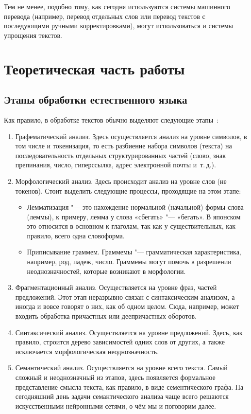 Тем не менее, подобно тому, как сегодня используются системы машинного перевода (например, перевод отдельных слов или перевод текстов с последующими ручными корректировками), могут использоваться и системы упрощения текстов.


\chapter{Теоретическая часть работы}


\section{Этапы обработки естественного языка}


Как правило, в обработке текстов обычно выделяют следующие этапы~\cite[с.~9]{Batruha}:
\begin{enumerate}[1.]%
  \item Графематический анализ.
    Здесь осуществляется анализ на уровне символов, в том числе и токенизация, то есть разбиение набора символов (текста) на последовательность отдельных структурированных частей (слово, знак препинания, число, гиперссылка, адрес электронной почты и~т.\,д.).
  \item Морфологический анализ.
    Здесь происходит анализ на уровне слов (не токенов).
    Стоит выделить следующие процессы, проходящие на этом этапе:
    \begin{itemize}%
      \item Лемматизация
        "--- это нахождение нормальной (начальной) формы слова (леммы), к примеру, лемма у слова «сбегать» "--- «бегать».
        В японском это относится в основном к глаголам, так как у существительных, как правило, всего одна словоформа. 
      \item Приписывание граммем.
        Граммемы "--- грамматическая характеристика, например, род, падеж, число.
        Граммемы могут помочь в разрешении неоднозначностей, которые возникают в морфологии.
    \end{itemize}
  \item Фрагментационный анализ.
    Осуществляется на уровне фраз, частей предложений. Этот этап неразрывно связан с синтаксическим анализом, а иногда и вовсе говорят о них, как об одном целом. Сюда, например, может входить обработка причастных или деепричастных оборотов.
  \item Синтаксический анализ.
    Осуществляется на уровне предложений.
    Здесь, как правило, строится дерево зависимостей одних слов от других, а также исключается морфологическая неоднозначность.
  \item Семантический анализ.
    Осуществляется на уровне всего текста.
    Самый сложный и неоднозначный из этапов, здесь появляется формальное представление смысла текста, как правило, в виде сементического графа.
    На сегодняшний день задачи семантического анализа чаще всего решаются искусственными нейронными сетями, о чём мы и поговорим далее.
\end{enumerate}


